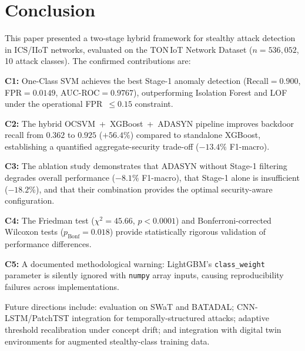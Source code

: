 \section{Conclusion}
\label{sec:conclusion}

This paper presented a two-stage hybrid framework for stealthy attack detection
in ICS/IIoT networks, evaluated on the TON\,IoT Network Dataset ($n=536{,}052$,
10 attack classes). The confirmed contributions are:

\textbf{C1:} One-Class SVM achieves the best Stage-1 anomaly detection
(Recall$=0.900$, FPR$=0.0149$, AUC-ROC$=0.9767$), outperforming Isolation
Forest and LOF under the operational FPR~$\leq 0.15$ constraint.

\textbf{C2:} The hybrid OCSVM~+~XGBoost~+~ADASYN pipeline improves backdoor
recall from $0.362$ to $0.925$ ($+56.4\%$) compared to standalone XGBoost,
establishing a quantified aggregate-security trade-off ($-13.4\%$ F1-macro).

\textbf{C3:} The ablation study demonstrates that ADASYN without Stage-1
filtering degrades overall performance ($-8.1\%$ F1-macro), that Stage-1
alone is insufficient ($-18.2\%$), and that their combination provides the
optimal security-aware configuration.

\textbf{C4:} The Friedman test ($\chi^2=45.66$, $p<0.0001$) and
Bonferroni-corrected Wilcoxon tests ($p_\text{Bonf}=0.018$) provide
statistically rigorous validation of performance differences.

\textbf{C5:} A documented methodological warning: LightGBM's
\texttt{class\_weight} parameter is silently ignored with \texttt{numpy}
array inputs, causing reproducibility failures across implementations.

Future directions include: evaluation on SWaT and BATADAL; CNN-LSTM/PatchTST
integration for temporally-structured attacks; adaptive threshold recalibration
under concept drift; and integration with digital twin environments for
augmented stealthy-class training data.

